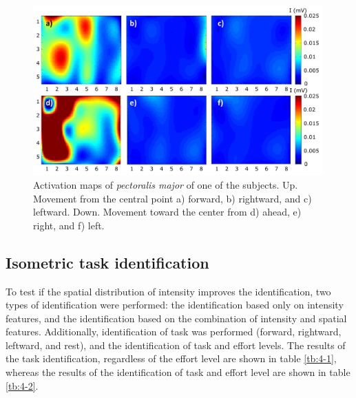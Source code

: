 \begin{figure}[ht]
\centering
\includegraphics[width=0.99\textwidth]{Images/figure4_2.png}
\caption{Activation maps of \textit{pectoralis major} of one of the subjects. Up. Movement from the central point a) forward, b) rightward, and c) leftward. Down. Movement toward the center from  d) ahead, e) right, and f) left.}
\label{fig:4-2}
\end{figure}

\subsection{Isometric task identification}
To test if the spatial distribution of intensity improves the identification, two types of identification were performed: the identification based only on intensity features, and the identification based on the combination of intensity and spatial features. Additionally, identification of task was performed (forward, rightward, leftward, and rest), and the identification of task and effort levels. The results of the task identification, regardless of the effort level are shown in table \ref{tb:4-1}, whereas the results of the identification of task and effort level are shown in table \ref{tb:4-2}.

